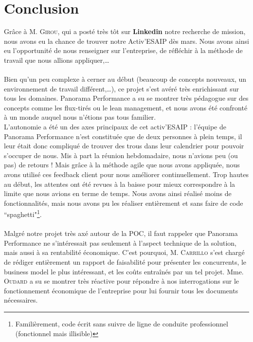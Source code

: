 \section{Conclusion}

Grâce à M. \textsc{Girou}, qui a posté très tôt sur \textbf{Linkedin} notre recherche de mission, nous avons eu la chance de trouver notre Activ'ESAIP dès mars. Nous avons ainsi eu l'opportunité de nous renseigner sur l'entreprise, de réfléchir à la méthode de travail que nous allions appliquer,\dots\\
\hfill \\
Bien qu'un peu complexe à cerner au début (beaucoup de concepts nouveaux, un environnement de travail différent,\dots), ce projet s'est avéré très enrichissant sur tous les domaines. Panorama Performance a su se montrer très pédagogue sur des concepts comme les flux-tirés ou le lean management, et nous avons été confronté à un monde auquel nous n'étions pas tous familier.\\

L'autonomie a été un des axes principaux de cet activ'ESAIP : l'équipe de Panorama Performance n'est constituée que de deux personnes à plein temps, il leur était donc compliqué de trouver des trous dans leur calendrier pour pouvoir s'occuper de nous. Mis à part la réunion hebdomadaire, nous n'avions peu (ou pas) de retours ! Mais grâce à la méthode agile que nous avons appliquée, nous avons utilisé ces feedback client pour nous améliorer continuellement. Trop hautes au début, les attentes ont été revues à la baisse pour mieux correspondre à la limite que nous avions en terme de temps. Nous avons ainsi réalisé moins de fonctionnalités, mais nous avons pu les réaliser entièrement et sans faire de code “spaghetti"\footnote{Familièrement, code écrit sans suivre de ligne de conduite professionnel (fonctionnel mais illisible)}.\\
\hfill \\
Malgré notre projet très axé autour de la POC, il faut rappeler que Panorama Performance ne s'intéressait pas seulement à l'aspect technique de la solution, mais aussi à sa rentabilité économique. C'est pourquoi, M. \textsc{Carrillo} s'est chargé de rédiger entièrement un rapport de faisabilité pour présenter les concurrents, le business model le plus intéressant, et les coûts entraînés par un tel projet. Mme. \textsc{Oudard} a su se montrer très réactive pour répondre à nos interrogations sur le fonctionnement économique de l'entreprise pour lui fournir tous les documents nécessaires.\\

